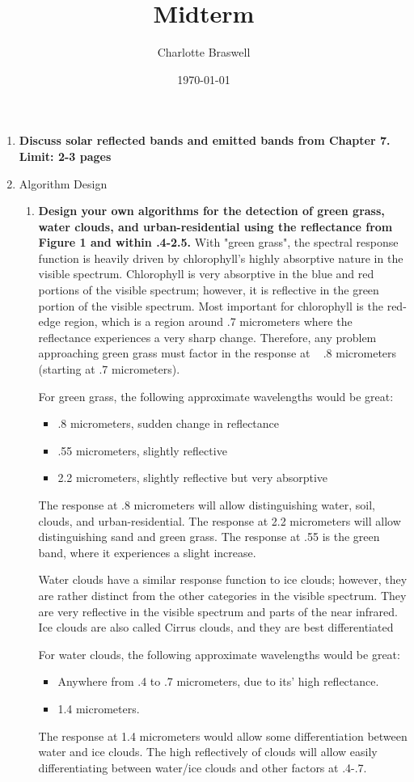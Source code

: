 \documentclass[12pt, letterpaper]{article}
\title{Midterm}
\author{Charlotte Braswell}
\date{\today}
\begin{document}
\maketitle
\pagebreak
\begin{enumerate}
    \item \textbf{Discuss solar reflected bands and emitted bands from Chapter 7. Limit: 2-3 pages}

    \pagebreak
    \item Algorithm Design
    \begin{enumerate}
    \item \textbf{Design your own algorithms for the detection of green grass, water clouds, and urban-residential using the reflectance from Figure 1 and within .4-2.5.}
    With "green grass", the spectral response function is heavily driven by chlorophyll's highly absorptive nature in the visible spectrum. Chlorophyll is very absorptive in the blue and red portions of the visible spectrum; however, it is reflective in the green portion of the visible spectrum. Most important for chlorophyll is the red-edge region, which is a region around .7 micrometers where the reflectance experiences a very sharp change. Therefore, any problem approaching green grass must factor in the response at ~ .8 micrometers (starting at .7 micrometers).

    For green grass, the following approximate wavelengths would be great:
    \begin{itemize}
    \item .8 micrometers, sudden change in reflectance
    \item .55 micrometers, slightly reflective
    \item 2.2 micrometers, slightly reflective but very absorptive
    \end{itemize}
    The response at .8 micrometers will allow distinguishing water, soil, clouds, and urban-residential. The response at 2.2 micrometers will allow distinguishing sand and green grass. The response at .55 is the green band, where it experiences a slight increase. 
    \bigskip

    Water clouds have a similar response function to ice clouds; however, they are rather distinct from the other categories in the visible spectrum. They are very reflective in the visible spectrum and parts of the near infrared. Ice clouds are also called Cirrus clouds, and they are best differentiated 

    For water clouds, the following approximate wavelengths would be great:
    \begin{itemize}
    \item Anywhere from .4 to .7 micrometers, due to its' high reflectance.
    \item 1.4 micrometers.
    \end{itemize}
    The response at 1.4 micrometers  would allow some differentiation between water and ice clouds. The high reflectively of clouds will allow easily differentiating between water/ice clouds and other factors at .4-.7.


\end{enumerate}
\end{enumerate}
\end{document}
